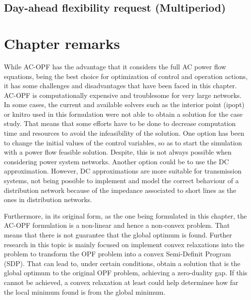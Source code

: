 \subsection{Day-ahead flexibility request (Multiperiod)}



\section{Chapter remarks}
While AC-OPF has the advantage that it considers the full AC power flow equations, being the best choice for optimization of control and operation actions, it has some challenges and disadvantages that have been faced in this chapter. AC-OPF is computationally expensive and troublesome for very large networks. In some cases, the current and available solvers such as the interior point (ipopt) or knitro used in this formulation were not able to obtain a solution for the case study. That means that some efforts have to be done to decrease computation time and resources to avoid the infeasibility of the solution. One option has been to change the initial values of the control variables, so as to start the simulation with a power flow feasible solution. Despite, this is not always possible when considering power system networks. Another option could be to use the DC approximation. However, DC approximations are more suitable for transmission systems, not being possible to implement and model the correct behaviour of a distribution network because of the impedance associated to short lines as the ones in distribution networks. 

Furthermore, in its original form, as the one being formulated in this chapter, the AC-OPF formulation is a non-linear and hence a non-convex problem. That means that there is not guarantee that the global optimum is found. Further research in this topic is mainly focused on implement convex relaxations into the problem to transform the OPF problem into a convex Semi-Definit Program (SDP). That can lead to, under certain conditions, obtain a solution that is the global optimum to the original OPF problem, achieving a zero-duality gap. If this cannot be achieved, a convex relaxation at least could help determinee how far the local minimum found is from the global minimum.  

